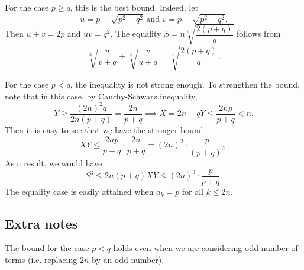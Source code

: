 \documentclass{article}
\begin{document}
For the case $p \geq q$, this is the best bound.
Indeed, let
\[ u = p + \sqrt{p^2 + q^2} \text{ and } v = p - \sqrt{p^2 - q^2}. \]
Then $u + v = 2p$ and $uv = q^2$.
The equality $S = n \sqrt[3]{\dfrac{2(p + q)}{q}}$ follows from
\[ \sqrt[3]{\frac{u}{v + q}} + \sqrt[3]{\frac{v}{u + q}} = \sqrt[3]{\frac{2(p + q)}{q}}. \]

For the case $p < q$, the inequality is not strong enough.
To strengthen the bound, note that in this case, by Cauchy-Schwarz inequality,
\[ Y \geq \frac{(2n)^2 q}{2n(p + q)} = \frac{2n}{p + q} \implies X = 2n - qY \leq \frac{2np}{p + q} < n. \]
Then it is easy to see that we have the stronger bound
\[ XY \leq \frac{2np}{p + q} \cdot \frac{2n}{p + q} = (2n)^2 \cdot \frac{p}{(p + q)^2}. \]
As a result, we would have
\[ S^3 \leq 2n (p + q) XY \leq (2n)^3 \cdot \frac{p}{p + q}. \]
The equality case is easily attained when $a_k = p$ for all $k \leq 2n$.



\subsection*{Extra notes}

The bound for the case $p < q$ holds even when we are considering odd number of terms (i.e. replacing $2n$ by an odd number).
\end{document}
